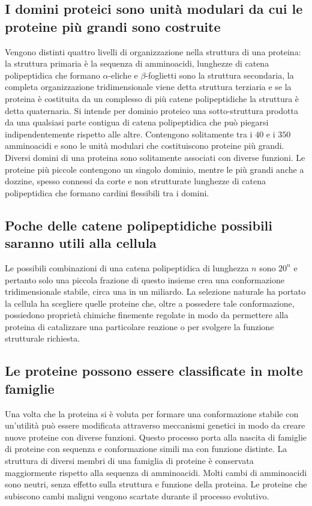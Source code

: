 \subsection{I domini proteici sono unit\`a modulari da cui le proteine pi\`u grandi sono costruite}
Vengono distinti quattro livelli di organizzazione nella struttura di una proteina: la struttura primaria \`e la sequenza di amminoacidi, lunghezze di
catena polipeptidica che formano $\alpha$-eliche e $\beta$-foglietti sono la struttura secondaria, la completa organizzazione tridimensionale viene
detta struttura terziaria e se la proteina \`e costituita da un complesso di pi\`u catene polipeptidiche la struttura \`e detta quaternaria. Si intende
per dominio proteico una sotto-struttura prodotta da una qualsiasi parte contigua di catena polipeptidica che pu\`o piegarsi indipendentemente rispetto 
alle altre. Contengono solitamente tra i $40$ e i $350$ amminoacidi e sono le unit\`a modulari che costituiscono proteine pi\`u grandi. Diversi domini di
una proteina sono solitamente associati con diverse funzioni. Le proteine pi\`u piccole contengono un singolo dominio, mentre le pi\`u grandi anche a
dozzine, spesso connessi da corte e non strutturate lunghezze di catena polipeptidica che formano cardini flessibili tra i domini.
\subsection{Poche delle catene polipeptidiche possibili saranno utili alla cellula} 
Le possibili combinazioni di una catena polipeptidica di lunghezza $n$ sono $20^n$ e pertanto solo una piccola frazione di questo insieme crea una conformazione tridimensionale stabile, 
circa una in un miliardo. La selezione naturale ha portato la cellula ha scegliere quelle proteine che, oltre a possedere tale conformazione, possiedono propriet\`a chimiche finemente
regolate in modo da permettere alla proteina di catalizzare una particolare reazione o per svolgere la funzione strutturale richiesta. 
\subsection{Le proteine possono essere classificate in molte famiglie}
Una volta che la proteina si \`e voluta per formare una conformazione stabile con un'utilit\`a pu\`o essere modificata attraverso meccanismi genetici in modo da creare nuove proteine
con diverse funzioni. Questo processo porta alla nascita di famiglie di proteine con sequenza e conformazione simili ma con funzione distinte. La struttura di diversi membri di una 
famiglia di proteine \`e conservata maggiormente rispetto alla sequenza di amminoacidi. Molti cambi di amminoacidi sono neutri, senza effetto sulla struttura e funzione della proteina.
Le proteine che subiscono cambi maligni vengono scartate durante il processo evolutivo. 
